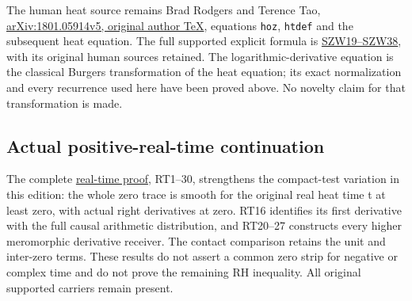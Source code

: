 \documentclass[
  10pt,
  a4paper,
]{article}
\begin{document}
The human heat source remains Brad Rodgers and Terence Tao,
\href{https://arxiv.org/src/1801.05914v5}{arXiv:1801.05914v5, original
author TeX}, equations \texttt{hoz}, \texttt{htdef} and the subsequent
heat equation. The full supported explicit formula is
\href{https://github.com/KokunoYumeto/zeta-function-research-reader/blob/3c022a0adde0a6aa3d8fc8e43ef42795d88e44b0/workbenches/splitzero-tandem/branches/tau-zero-prime-positivity/SUPPORTED_ZERO_PRIME_WEIL_DERIVATION.md}{SZW19--SZW38},
with its original human sources retained. The logarithmic-derivative
equation is the classical Burgers transformation of the heat equation;
its exact normalization and every recurrence used here have been proved
above. No novelty claim for that transformation is made.

\subsection{Actual positive-real-time
continuation}\label{actual-positive-real-time-continuation}

The complete \href{REAL_TIME_HEAT_TRACE_DERIVATION.md}{real-time proof},
RT1--30, strengthens the compact-test variation in this edition: the
whole zero trace is smooth for the original real heat time t at least
zero, with actual right derivatives at zero. RT16 identifies its first
derivative with the full causal arithmetic distribution, and RT20--27
constructs every higher meromorphic derivative receiver. The contact
comparison retains the unit and inter-zero terms. These results do not
assert a common zero strip for negative or complex time and do not prove
the remaining RH inequality. All original supported carriers remain
present.
\end{document}
